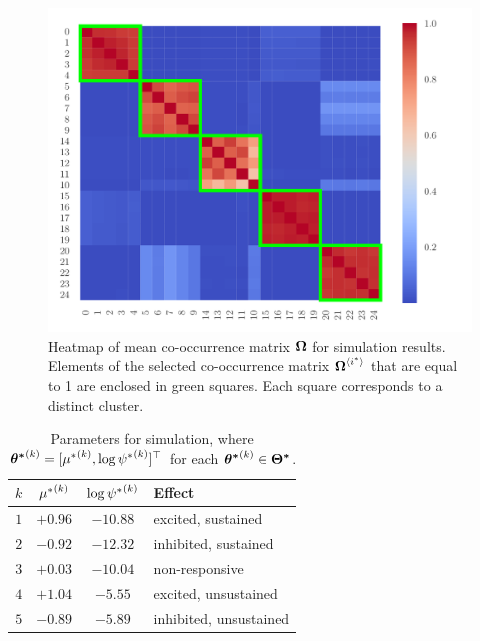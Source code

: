 \documentclass[twoside]{article}
\begin{document}
\begin{figure}[h]
\begin{center}
\includegraphics[scale=0.33]{../img/sim.pdf}
\end{center}
\caption{Heatmap of mean co-occurrence matrix $\boldsymbol{\Omega}$ for simulation results.  Elements of the selected co-occurrence matrix $\boldsymbol{\Omega}^{\langle i^*\rangle}_{}$ that are equal to 1 are enclosed in green squares.  Each square corresponds to a distinct cluster.}
\label{sim-hm}
\end{figure}

\begin{table}[h]
\vspace{-3mm}
\caption{Parameters for simulation, where $\boldsymbol{\theta^*}^{(k)}_{} = [{\mu^*}^{(k)}_{}, \log {\psi^*}^{(k)}_{}]^\top$ for each $\boldsymbol{\theta^*}^{(k)}_{} \in \boldsymbol{\Theta^*}$.} \label{sim-table}
\begin{center}
\begin{tabular}{c|ccl}
$k$ & ${\mu^*}^{(k)}_{}$ & $\log {\psi^*}^{(k)}_{}$ &\textbf{Effect} \\
\hline
$1$ & $+0.96$ & $-10.88$ &  excited, sustained \\
$2$ &$-0.92$ & $-12.32$ & inhibited, sustained \\
$3$ &$+0.03$ & $-10.04$  & non-responsive \\
$4$ &$+1.04$ & $-5.55$ & excited, unsustained\\
$5$ &$-0.89$ & $-5.89$ & inhibited, unsustained
\end{tabular}
\vspace{-4mm}
\end{center}
\end{table}
  
\end{document}
